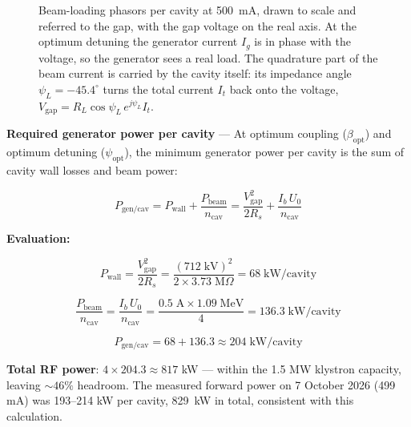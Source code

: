 \begin{figure}[tbp]
\centering
\begin{fitpicture}\end{fitpicture}
\caption[Beam-loading current phasors at 500 mA]{Beam-loading phasors per cavity at \qty{500}{\milli\ampere}, drawn to scale and referred to the gap, with the gap voltage on the real axis. At the optimum detuning the generator current $I_g$ is in phase with the voltage, so the generator sees a real load. The quadrature part of the beam current is carried by the cavity itself: its impedance angle $\psi_L = -45.4^\circ$ turns the total current $I_t$ back onto the voltage, $V_\text{gap} = R_L\cos\psi_L\,e^{j\psi_L} I_t$.}\label{fig:beam-loading-phasor}
\end{figure}

\textbf{Required generator power per cavity} --- At optimum coupling (\(\beta_\text{opt}\)) and optimum detuning (\(\psi_\text{opt}\)), the minimum generator power per cavity is the sum of cavity wall losses and beam power:

\begin{equation}\label{eq:pgen}
P_\text{gen/cav} = P_\text{wall} + \frac{P_\text{beam}}{n_\text{cav}} = \frac{V_\text{gap}^2}{2R_s} + \frac{I_b \, U_0}{n_\text{cav}}
\end{equation}

\textbf{Evaluation:}

\begin{equation}\label{eq:pwall}
P_\text{wall} = \frac{V_\text{gap}^2}{2R_s} = \frac{(712\;\text{kV})^2}{2 \times 3.73\;\text{M}\Omega} = 68\;\text{kW/cavity}
\end{equation}

\begin{equation}\label{eq:pbeam}
\frac{P_\text{beam}}{n_\text{cav}} = \frac{I_b \, U_0}{n_\text{cav}} = \frac{0.5\;\text{A} \times 1.09\;\text{MeV}}{4} = 136.3\;\text{kW/cavity}
\end{equation}

\begin{equation}\label{eq:pgen-eval}
P_\text{gen/cav} = 68 + 136.3 \approx 204\;\text{kW/cavity}
\end{equation}

\textbf{Total RF power}: \(4 \times 204.3 \approx 817\) kW --- within the 1.5 MW klystron capacity, leaving \(\sim 46\%\) headroom. The measured forward power on 7 October 2026 (499 mA) was 193--214 kW per cavity, \qty{829}{\kilo\watt} in total, consistent with this calculation.

